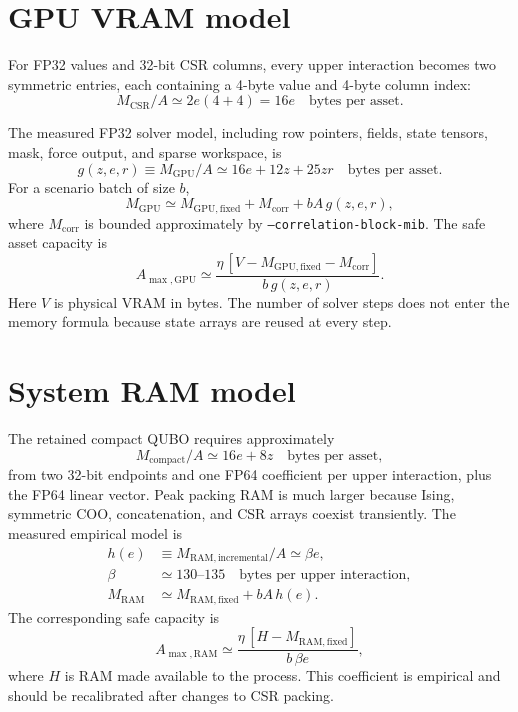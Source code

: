 \documentclass[10pt,a4paper]{article}
\begin{document}
\section*{GPU VRAM model}

For FP32 values and 32-bit CSR columns, every upper interaction becomes two
symmetric entries, each containing a 4-byte value and 4-byte column index:
\begin{equation}
  M_{\mathrm{CSR}}/A \simeq 2e(4+4)=16e
  \quad\text{bytes per asset}.
\end{equation}

The measured FP32 solver model, including row pointers, fields, state tensors,
mask, force output, and sparse workspace, is
\begin{equation}
  g(z,e,r) \equiv M_{\mathrm{GPU}}/A
  \simeq 16e + 12z + 25zr
  \quad\text{bytes per asset}.
  \label{eq:gpu-per-asset}
\end{equation}
For a scenario batch of size $b$,
\begin{equation}
  M_{\mathrm{GPU}}
  \simeq M_{\mathrm{GPU,fixed}} + M_{\mathrm{corr}} + bA\,g(z,e,r),
\end{equation}
where $M_{\mathrm{corr}}$ is bounded approximately by
\texttt{--correlation-block-mib}.  The safe asset capacity is
\begin{equation}
  A_{\max,\mathrm{GPU}}
  \simeq
  \frac{\eta\,[V-M_{\mathrm{GPU,fixed}}-M_{\mathrm{corr}}]}
       {b\,g(z,e,r)}.
  \label{eq:gpu-capacity}
\end{equation}
Here $V$ is physical VRAM in bytes.  The number of solver steps does not enter
the memory formula because state arrays are reused at every step.

\section*{System RAM model}

The retained compact QUBO requires approximately
\begin{equation}
  M_{\mathrm{compact}}/A \simeq 16e+8z
  \quad\text{bytes per asset},
\end{equation}
from two 32-bit endpoints and one FP64 coefficient per upper interaction, plus
the FP64 linear vector.  Peak packing RAM is much larger because Ising,
symmetric COO, concatenation, and CSR arrays coexist transiently.  The measured
empirical model is
\begin{align}
  h(e) &\equiv M_{\mathrm{RAM,incremental}}/A
        \simeq \beta e, \\
  \beta &\simeq 130\text{--}135
        \quad\text{bytes per upper interaction}, \\
  M_{\mathrm{RAM}} &\simeq M_{\mathrm{RAM,fixed}}+bA\,h(e).
  \label{eq:ram-model}
\end{align}
The corresponding safe capacity is
\begin{equation}
  A_{\max,\mathrm{RAM}}
  \simeq
  \frac{\eta\,[H-M_{\mathrm{RAM,fixed}}]}
       {b\,\beta e},
  \label{eq:ram-capacity}
\end{equation}
where $H$ is RAM made available to the process.  This coefficient is empirical
and should be recalibrated after changes to CSR packing.
\end{document}
